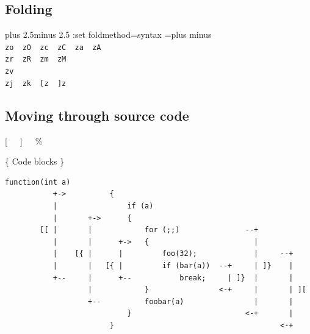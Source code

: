 \documentclass[14pt,svgnames,compress]{beamer}
\newcommand\hl[1]{\textcolor{HlColor}{#1}}
\newcommand\framesubtitlefontsize{\huge}
\newcommand\singleframesubtitle[1]{
    \begin{center}
        \framesubtitlefontsize #1
    \end{center}
}
\newcommand\subtitleframe{
    \begin{frame}
        \singleframesubtitle{\insertsubsectionhead}
    \end{frame}
}
\newcommand\wordspacing[2]{
    \spaceskip=#1\fontdimen2\font plus #1\fontdimen3\font minus #1\fontdimen4\font
    #2
    \spaceskip=\fontdimen2\font plus \fontdimen3\font minus \fontdimen4\font
}
\begin{document}
\subsection{Folding}

\subtitleframe

\begin{frame}[fragile]
    \begin{spacing}{1.5} %
        \Large
        \centering
        \wordspacing{2.5}{:set \hl{foldmethod}=syntax} \\
        \vspace{1cm}
        \verb|zo  zO  zc  zC  za  zA| \\
        \verb|zr  zR  zm  zM| \\
        \verb|zv| \\
        \verb|zj  zk  [z  ]z| \\
    \end{spacing}
\end{frame}


\subsection{Moving through source code}

\begin{frame}
    \singleframesubtitle{\insertsubsectionhead}
    \vskip 2pt
    \large
    \begin{center}
        \hl{[~~~]~~~\%}
    \end{center}
\end{frame}

\begin{frame}
    \singleframesubtitle{ \hl{\{} Code blocks \hl{\}} }
\end{frame}

\begin{frame}[fragile]
    \scriptsize
    \begin{Verbatim}[gobble=8]
                        function(int a)
           +->          {
           |                if (a)
           |       +->      {
        [[ |       |            for (;;)               --+
           |       |      +->   {                        |
           |    [{ |      |         foo(32);             |     --+
           |       |   [{ |         if (bar(a))  --+     | ]}    |
           +--     |      +--           break;     | ]}  |       |
                   |            }                <-+     |       | ][
                   +--          foobar(a)                |       |
                            }                          <-+       |
                        }                                      <-+
    \end{Verbatim}
\end{frame}
\end{document}
